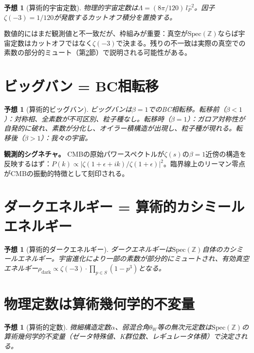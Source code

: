 \documentclass[11pt,a4paper]{article}
\newtheorem{conjecture}[theorem]{予想}
\newcommand{\Spec}{\mathrm{Spec}}
\begin{document}
\begin{conjecture}[算術的宇宙定数]
物理的宇宙定数は$\Lambda = (8\pi/120)\,l_P^{-2}$。因子$\zeta(-3) = 1/120$が発散するカットオフ積分を置換する。
\end{conjecture}

数値的にはまだ観測値と不一致だが、枠組みが重要：真空が$\Spec(\mathbb{Z})$ならば宇宙定数はカットオフではなく$\zeta(-3)$で決まる。残りの不一致は実際の真空での素数の部分的ミュート（第\ref{sec:dark}節）で説明される可能性がある。

\section{ビッグバン = BC相転移}

\begin{conjecture}[算術的ビッグバン]
ビッグバンは$\beta = 1$でのBC相転移。転移前（$\beta < 1$）：対称相、全素数が不可区別、粒子種なし。転移時（$\beta = 1$）：ガロア対称性が自発的に破れ、素数が分化し、オイラー積構造が出現し、粒子種が現れる。転移後（$\beta > 1$）：我々の宇宙。
\end{conjecture}

\textbf{観測的シグネチャ。} CMBの原始パワースペクトルが$\zeta(s)$の$\beta = 1$近傍の構造を反映するはず：$P(k) \propto |\zeta(1+\epsilon+ik)/\zeta(1+\epsilon)|^2$。臨界線上のリーマン零点がCMBの振動的特徴として刻印される。

\section{ダークエネルギー = 算術的カシミールエネルギー}
\label{sec:dark}

\begin{conjecture}[算術的ダークエネルギー]
ダークエネルギーは$\Spec(\mathbb{Z})$自体のカシミールエネルギー。宇宙進化により一部の素数が部分的にミュートされ、有効真空エネルギー$\rho_{\mathrm{dark}} \propto \zeta(-3) \cdot \prod_{p \in S}(1-p^3)$となる。
\end{conjecture}

\section{物理定数は算術幾何学的不変量}

\begin{conjecture}[算術的定数]
微細構造定数$\alpha$、弱混合角$\theta_W$等の無次元定数は$\Spec(\mathbb{Z})$の算術幾何学的不変量（ゼータ特殊値、K群位数、レギュレータ体積）で決定される。
\end{conjecture}
\end{document}
